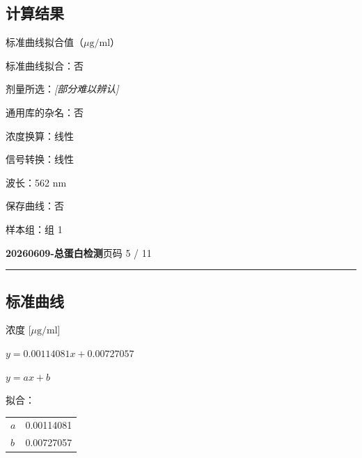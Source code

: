 \documentclass[UTF8,10pt,a4paper,fontset=fandol]{ctexart}
\newcommand{\fieldvalue}[1]{#1}
\begin{document}

\subsection*{计算结果}

标准曲线拟合值（$\mu\mathrm{g}/\mathrm{ml}$）

标准曲线拟合：否

剂量所选：\textit{[部分难以辨认]}

通用库的杂名：否

浓度换算：线性

信号转换：线性

波长：\fieldvalue{562 nm}

保存曲线：\fieldvalue{否}

样本组：\fieldvalue{组 1}

\newpage

\noindent\textbf{20260609-总蛋白检测}\hfill 页码 5 / 11

\noindent\rule{\linewidth}{0.4pt}

\begin{center}
\section*{标准曲线}


\vspace{0.3em}
浓度 [$\mu\mathrm{g}/\mathrm{ml}$]
\end{center}

\noindent
$y = 0.00114081x + 0.00727057$

\noindent
$y = ax + b$

\noindent
拟合：

\begin{tabular}{ll}
$a$ & 0.00114081 \\
$b$ & 0.00727057
\end{tabular}

\medskip
\end{document}
